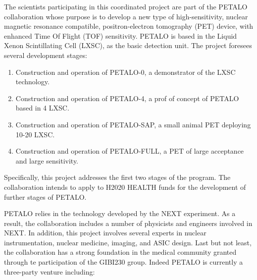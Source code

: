 The scientists participating in this coordinated project are part of the PETALO collaboration
whose purpose is to develop a new type of  high-sensitivity, nuclear magnetic resonance compatible, positron-electron tomography (PET) device, with enhanced Time Of Flight (TOF) sensitivity. PETALO is based in the Liquid Xenon Scintillating Cell (LXSC), as the basic detection unit. The project foresees several development stages:
\begin{enumerate}
\item Construction and operation of PETALO-0, a demonstrator of the LXSC technology. 
\item Construction and operation of PETALO-4, a prof of concept of PETALO based in 4 LXSC.
\item Construction and operation of PETALO-SAP, a small animal PET deploying 10-20 LXSC.
\item Construction and operation of PETALO-FULL, a PET of large acceptance and large sensitivity.
\end{enumerate}

Specifically, this project addresses the first two stages of the program. The collaboration intends to apply to H2020 HEALTH funds for the development of further stages of PETALO.

PETALO relies in the technology developed by the NEXT experiment. As a result, the  collaboration includes a number of physicists and engineers involved in NEXT. In addition, this project involves several experts in nuclear instrumentation, nuclear medicine, imaging, and ASIC design. Last but not least, the collaboration has a strong foundation in the medical community granted through te participation of the GIBI230 group. Indeed PETALO is currently a three-party venture including:

